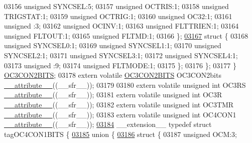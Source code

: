 \begin{DoxyCode}
03156       \textcolor{keywordtype}{unsigned} SYNCSEL:5;
03157       \textcolor{keywordtype}{unsigned} OCTRIS:1;
03158       \textcolor{keywordtype}{unsigned} TRIGSTAT:1;
03159       \textcolor{keywordtype}{unsigned} OCTRIG:1;
03160       \textcolor{keywordtype}{unsigned} OC32:1;
03161       \textcolor{keywordtype}{unsigned} :3;
03162       \textcolor{keywordtype}{unsigned} OCINV:1;
03163       \textcolor{keywordtype}{unsigned} FLTTRIEN:1;
03164       \textcolor{keywordtype}{unsigned} FLTOUT:1;
03165       \textcolor{keywordtype}{unsigned} FLTMD:1;
03166     \};
\hypertarget{a00015_source_l03167}{}\hyperlink{a00015}{03167}     \textcolor{keyword}{struct }\{
03168       \textcolor{keywordtype}{unsigned} SYNCSEL0:1;
03169       \textcolor{keywordtype}{unsigned} SYNCSEL1:1;
03170       \textcolor{keywordtype}{unsigned} SYNCSEL2:1;
03171       \textcolor{keywordtype}{unsigned} SYNCSEL3:1;
03172       \textcolor{keywordtype}{unsigned} SYNCSEL4:1;
03173       \textcolor{keywordtype}{unsigned} :9;
03174       \textcolor{keywordtype}{unsigned} FLTMODE:1;
03175     \};
03176   \};
03177 \} \hyperlink{a00014_d3/da3/a00627}{OC3CON2BITS};
03178 \textcolor{keyword}{extern} \textcolor{keyword}{volatile} \hyperlink{a00014_d3/da3/a00627}{OC3CON2BITS} OC3CON2bits \hyperlink{a00015_a493c46f03454991ccc5aa7a6e1dfb2a7}{\_\_attribute\_\_}((\_\_sfr\_\_));
03179 
03180 \textcolor{keyword}{extern} \textcolor{keyword}{volatile} \textcolor{keywordtype}{unsigned} \textcolor{keywordtype}{int}  OC3RS \hyperlink{a00015_a493c46f03454991ccc5aa7a6e1dfb2a7}{\_\_attribute\_\_}((\_\_sfr\_\_));
03181 \textcolor{keyword}{extern} \textcolor{keyword}{volatile} \textcolor{keywordtype}{unsigned} \textcolor{keywordtype}{int}  OC3R \hyperlink{a00015_a493c46f03454991ccc5aa7a6e1dfb2a7}{\_\_attribute\_\_}((\_\_sfr\_\_));
03182 \textcolor{keyword}{extern} \textcolor{keyword}{volatile} \textcolor{keywordtype}{unsigned} \textcolor{keywordtype}{int}  OC3TMR \hyperlink{a00015_a493c46f03454991ccc5aa7a6e1dfb2a7}{\_\_attribute\_\_}((\_\_sfr\_\_));
03183 \textcolor{keyword}{extern} \textcolor{keyword}{volatile} \textcolor{keywordtype}{unsigned} \textcolor{keywordtype}{int}  OC4CON1 \hyperlink{a00015_a493c46f03454991ccc5aa7a6e1dfb2a7}{\_\_attribute\_\_}((\_\_sfr\_\_));
\hypertarget{a00015_source_l03184}{}\hyperlink{a00014}{03184} \_\_extension\_\_ \textcolor{keyword}{typedef} \textcolor{keyword}{struct }tagOC4CON1BITS \{
\hypertarget{a00015_source_l03185}{}\hyperlink{a00015}{03185}   \textcolor{keyword}{union }\{
\hypertarget{a00015_source_l03186}{}\hyperlink{a00015}{03186}     \textcolor{keyword}{struct }\{
03187       \textcolor{keywordtype}{unsigned} OCM:3;

\end{DoxyCode}
